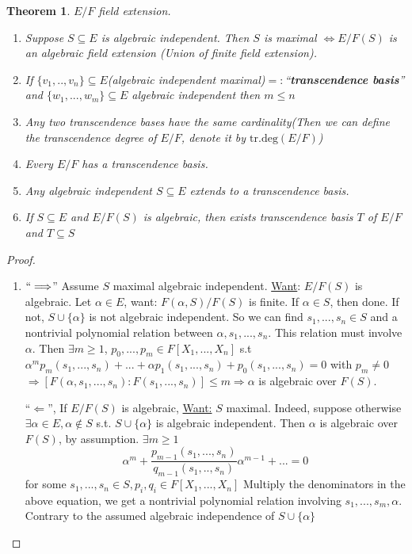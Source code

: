 \documentclass[11pt]{article}
\newtheorem{thm}{Theorem}[section]
\newcommand{\Lrta}{\Longrightarrow}
\newcommand{\Llta}{\Longleftarrow}
\newcommand{\Llrta}{\Longleftrightarrow}
\begin{document}
\begin{thm}\label{thm:field_extension}
$E/F$ field extension. 
\begin{enumerate}[label=(\alph*)]
\item Suppose $S\subseteq E$ is algebraic independent. Then $S$ is maximal $\Llrta E/F(S)$ is an algebraic field extension (Union of finite field extension).
\item If $\{v_1,..,v_n\}\subseteq E$(algebraic independent maximal)$=:$``\textbf{transcendence basis}'' and $\{w_1,...,w_m\}\subseteq E$ algebraic independent then $m\leq n$
\item Any two transcendence bases have the same cardinality(Then we can define the transcendence degree of $E/F$, denote it by $\text{tr.deg}(E/F)$)
\item Every $E/F$ has a transcendence basis.
\item Any algebraic independent $S\subseteq E$ extends to a transcendence basis.
\item If $S\subseteq E$ and $E/F(S)$ is algebraic, then exists transcendence basis $T$ of $E/F$ and $T\subseteq S$
\end{enumerate}
\end{thm}
\begin{proof}
\begin{enumerate}[label=(\alph*)]
\item $``\Lrta$'' Assume $S$ maximal algebraic independent. \underline{Want}: $E/F(S)$ is algebraic. Let $\alpha\in E$, want: $F(\alpha,S)/F(S)$ is finite. If $\alpha\in S$, then done. If not, $S\cup \{\alpha\}$ is not algebraic independent. So we can find $s_1,...,s_n\in S$ and a nontrivial polynomial relation between $\alpha,s_1,...,s_n$. This relation must involve $\alpha$. Then $\exists m\geq 1$, $p_0,...,p_m\in F[X_1,...,X_n]$ s.t $\alpha^m p_m(s_1,...,s_n)+...+\alpha p_1(s_1,...,s_n)+p_0(s_1,...,s_n)=0$ with $p_m\neq 0$ $\Lrta [F(\alpha, s_1,...,s_n):F(s_1,...,s_n)]\leq m\Lrta \alpha$ is algebraic over $F(S)$.
 
 ``$\Llta$'', If $E/F(S)$ is algebraic, \underline{Want:} $S$ maximal. Indeed, suppose otherwise $\exists \alpha\in E, \alpha\notin S$ s.t. $S\cup \{\alpha\}$ is algebraic independent. Then $\alpha$ is algebraic over $F(S)$, by assumption. $\exists m\geq 1$
 $$
\alpha^m+\frac{p_{m-1}(s_1,...,s_n)}{q_{m-1}(s_1,..,s_n)}\alpha^{m-1}+...=0
 $$
 for some $s_1,...,s_n\in S, p_i,q_i\in F[X_1,...,X_n]$ Multiply the denominators in the above equation, we get a nontrivial polynomial relation involving $s_1,...,s_m,\alpha$. Contrary to the assumed algebraic independence of $S\cup\{\alpha\}$
\end{enumerate}
\end{proof}
\end{document}

